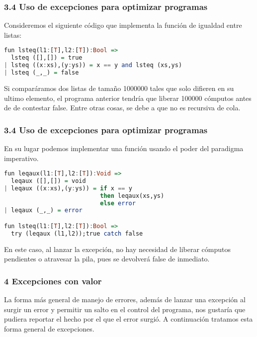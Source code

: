 \documentclass[xcolor=dvipsnames,table,spanish]{beamer}
\begin{document}
\begin{frame}[fragile]
\frametitle{3.4 Uso de excepciones para optimizar programas}
Consideremos el siguiente código que implementa la función de igualdad entre listas:

\begin{lstlisting}[language=Haskell]
fun lsteq(l1:[T],l2:[T]):Bool =>
  lsteq ([],[]) = true
| lsteq ((x:xs),(y:ys)) = x == y and lsteq (xs,ys)
| lsteq (_,_) = false
\end{lstlisting}

Si comparáramos dos listas de tamaño 1000000 tales que solo difieren en su ultimo elemento, el programa anterior tendría que liberar 100000 cómputos antes de de contestar false. Entre otras cosas, se debe a que no es recursiva de cola.
\end{frame}
\begin{frame}[fragile]
\frametitle{3.4 Uso de excepciones para optimizar programas}
En su lugar podemos implementar una función usando el poder del paradigma imperativo.

\begin{lstlisting}[language=Haskell]
fun leqaux(l1:[T],l2:[T]):Void =>
  leqaux ([],[]) = void
| leqaux ((x:xs),(y:ys)) = if x == y
                           then leqaux(xs,ys)
                           else error
| leqaux (_,_) = error

fun lsteq(l1:[T],l2:[T]):Bool =>
  try (leqaux (l1,l2));true catch false
\end{lstlisting}

En este caso, al lanzar la excepción, no hay necesidad de liberar cómputos pendientes o atravesar la pila, pues se devolverá false de inmediato.
\end{frame}
\begin{frame}
\frametitle{4 Excepciones con valor}
La forma más general de manejo de errores, además de lanzar una excepción al surgir un error y permitir un salto en el control del programa, nos gustaría que  pudiera reportar el hecho por el que el error surgió. A continuación tratamos esta forma general de excepciones.
\end{frame}
\end{document}
